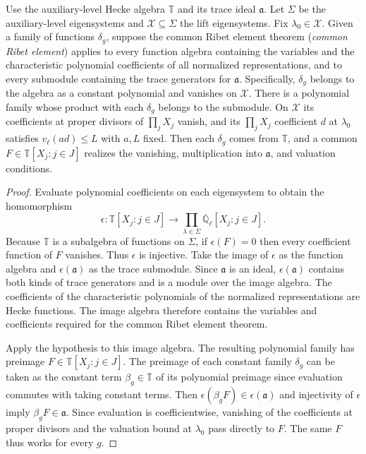 \begin{lemma}
\label{lem:c-hecke-ribet-polynomial}
\emitthmsource
Use the auxiliary-level Hecke algebra $\mathbb T$ and its trace ideal $\mathfrak a$.
Let $\Sigma$ be the auxiliary-level eigensystems and $\mathcal X\subseteq\Sigma$ the lift eigensystems. Fix $\lambda_0\in\mathcal X$.
Given a family of functions $\delta_g$, suppose the common Ribet element theorem (\emph{common Ribet element}) applies to every function algebra containing the variables and the characteristic polynomial coefficients of all normalized representations, and to every submodule containing the trace generators for $\mathfrak a$.
Specifically, $\delta_g$ belongs to the algebra as a constant polynomial and vanishes on $\mathcal X$. There is a polynomial family whose product with each $\delta_g$ belongs to the submodule. On $\mathcal X$ its coefficients at proper divisors of $\prod_jX_j$ vanish, and its $\prod_jX_j$ coefficient $d$ at $\lambda_0$ satisfies $v_\ell(a d)\le L$ with $a,L$ fixed.
Then each $\delta_g$ comes from $\mathbb T$, and a common $F\in\mathbb T[X_j:j\in J]$ realizes the vanishing, multiplication into $\mathfrak a$, and valuation conditions.
\end{lemma}
\begin{proof}
Evaluate polynomial coefficients on each eigensystem to obtain the homomorphism
\[
 \epsilon:\mathbb T[X_j:j\in J]\longrightarrow
     \prod_{\lambda\in\Sigma}\overline{\mathbb Q}_\ell[X_j:j\in J].
\]
Because $\mathbb T$ is a subalgebra of functions on $\Sigma$, if $\epsilon(F)=0$ then every coefficient function of $F$ vanishes. Thus $\epsilon$ is injective.
Take the image of $\epsilon$ as the function algebra and $\epsilon(\mathfrak a)$ as the trace submodule. Since $\mathfrak a$ is an ideal, $\epsilon(\mathfrak a)$ contains both kinds of trace generators and is a module over the image algebra.
The coefficients of the characteristic polynomials of the normalized representations are Hecke functions. The image algebra therefore contains the variables and coefficients required for the common Ribet element theorem.

Apply the hypothesis to this image algebra. The resulting polynomial family has preimage $F\in\mathbb T[X_j:j\in J]$.
The preimage of each constant family $\delta_g$ can be taken as the constant term $\beta_g\in\mathbb T$ of its polynomial preimage since evaluation commutes with taking constant terms.
Then $\epsilon(\beta_gF)\in\epsilon(\mathfrak a)$ and injectivity of $\epsilon$ imply $\beta_gF\in\mathfrak a$.
Since evaluation is coefficientwise, vanishing of the coefficients at proper divisors and the valuation bound at $\lambda_0$ pass directly to $F$. The same $F$ thus works for every $g$.
\end{proof}

